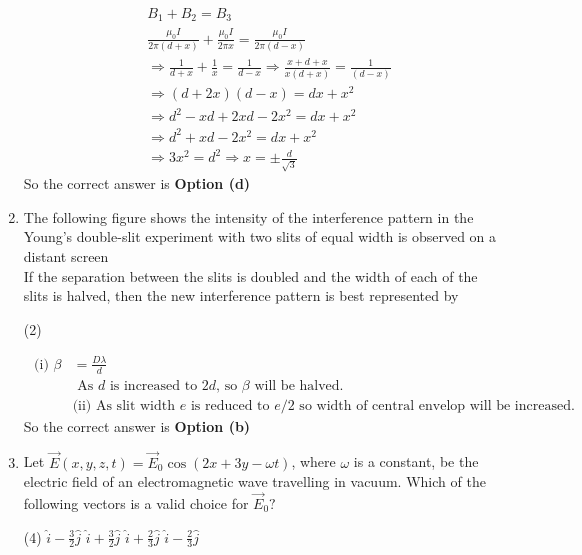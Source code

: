 \begin{enumerate}
\begin{answer}
	\begin{align*}
	&B_{1}+B_{2}=B_{3}\\
	&\frac{\mu_{0} I}{2 \pi(d+x)}+\frac{\mu_{0} I}{2 \pi x}=\frac{\mu_{0} I}{2 \pi(d-x)} \\
	&\Rightarrow \frac{1}{d+x}+\frac{1}{x}=\frac{1}{d-x} \Rightarrow \frac{x+d+x}{x(d+x)}=\frac{1}{(d-x)} \\
	&\Rightarrow(d+2 x)(d-x)=d x+x^{2} \\
	&\Rightarrow d^{2}-x d+2 x d-2 x^{2}=d x+x^{2} \\
	&\Rightarrow d^{2}+x d-2 x^{2}=d x+x^{2} \\
	&\Rightarrow 3 x^{2}=d^{2} \Rightarrow x=\pm \frac{d}{\sqrt{3}}
	\end{align*}
	So the correct answer is \textbf{Option (d)}
\end{answer}
\item The following figure shows the intensity of the interference pattern in the Young's double-slit experiment with two slits of equal width is observed on a distant screen	\\
If the separation between the slits is doubled and the width of each of the slits is halved, then the new interference pattern is best represented by 
\begin{tasks}(2)
	\task[\textbf{a.}]
	\task[\textbf{b.}]
	\task[\textbf{c.}]
	\task[\textbf{d.}] 
\end{tasks}
\begin{answer}
	\begin{align*}
	\text { (i) } \beta&=\frac{D \lambda}{d}\\
&\text{	As $d$ is increased to $2 d$, so $\beta$ will be halved.}\\
	&\text{(ii) As slit width $e$ is reduced to $e / 2$ so width of central envelop will be increased.}
	\end{align*}
		So the correct answer is \textbf{Option (b)}
\end{answer}
\item  Let $\vec{E}(x, y, z, t)=\vec{E}_{0} \cos (2 x+3 y-\omega t)$, where $\omega$ is a constant, be the electric field of an electromagnetic wave travelling in vacuum. Which of the following vectors is a valid choice for $\vec{E}_{0} ?$	
 \begin{tasks}(4)
	\task[\textbf{a.}] $\hat{i}-\frac{3}{2} \hat{j}$
	\task[\textbf{b.}]$\hat{i}+\frac{3}{2} \hat{j}$
	\task[\textbf{c.}]$\hat{i}+\frac{2}{3} \hat{j}$
	\task[\textbf{d.}] $\hat{i}-\frac{2}{3} \hat{j}$
\end{tasks}

\end{enumerate}
